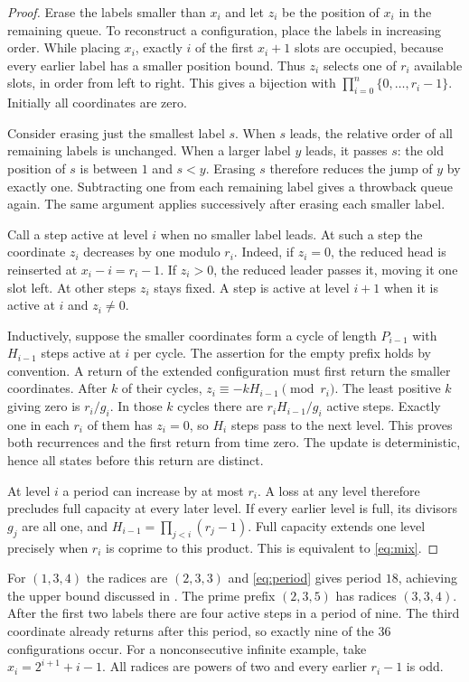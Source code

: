 \documentclass[11pt]{article}
\begin{document}
\begin{proof}
Erase the labels smaller than $x_i$ and let $z_i$ be the position of $x_i$
in the remaining queue. To reconstruct a configuration, place the labels in
increasing order. While placing $x_i$, exactly $i$ of the first $x_i+1$ slots
are occupied, because every earlier label has a smaller position bound. Thus
$z_i$ selects one of $r_i$ available slots, in order from left to right. This
gives a bijection with $\prod_{i=0}^{n}\{0,\ldots,r_i-1\}$. Initially all
coordinates are zero.

Consider erasing just the smallest label $s$. When $s$ leads, the relative
order of all remaining labels is unchanged. When a larger label $y$ leads,
it passes $s$: the old position of $s$ is between $1$ and $s<y$.
Erasing $s$ therefore reduces the jump of $y$ by exactly one. Subtracting
one from each remaining label gives a throwback queue again. The same
argument applies successively after erasing each smaller label.

Call a step active at level $i$ when no smaller label leads. At such a step
the coordinate $z_i$ decreases by one modulo $r_i$. Indeed, if $z_i=0$,
the reduced head is reinserted at $x_i-i=r_i-1$. If $z_i>0$, the reduced
leader passes it, moving it one slot left. At other steps $z_i$ stays fixed.
A step is active at level $i+1$ when it is active at $i$ and $z_i\ne0$.

Inductively, suppose the smaller coordinates form a cycle of length $P_{i-1}$
with $H_{i-1}$ steps active at $i$ per cycle. The assertion for the empty
prefix holds by convention. A return of the extended configuration must
first return the smaller coordinates. After $k$ of their cycles,
$z_i\equiv-kH_{i-1}\pmod{r_i}$. The least positive $k$ giving zero is
$r_i/g_i$. In those $k$ cycles there are $r_i H_{i-1}/g_i$ active steps.
Exactly one in each $r_i$ of them has $z_i=0$, so $H_i$ steps pass to the
next level. This proves both recurrences and the first return from time zero.
The update is deterministic, hence all states before this return are distinct.

At level $i$ a period can increase by at most $r_i$. A loss at any level
therefore precludes full capacity at every later level. If every earlier
level is full, its divisors $g_j$ are all one, and
$H_{i-1}=\prod_{j<i}(r_j-1)$. Full capacity extends one level precisely
when $r_i$ is coprime to this product. This is equivalent to
\eqref{eq:mix}.
\end{proof}

For $(1,3,4)$ the radices are $(2,3,3)$ and \eqref{eq:period} gives period
$18$, achieving the upper bound discussed in \cite[p.\ 16]{dd}. The prime
prefix $(2,3,5)$ has radices $(3,3,4)$. After the first two labels there
are four active steps in a period of nine. The third coordinate already
returns after this period, so exactly nine of the 36 configurations occur.
For a nonconsecutive infinite example, take $x_i=2^{i+1}+i-1$. All radices
are powers of two and every earlier $r_i-1$ is odd.
\end{document}
